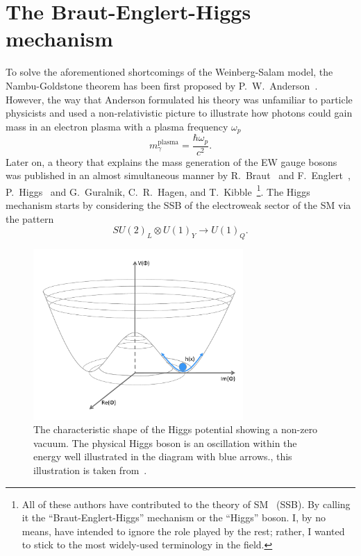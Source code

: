 \section{The Braut-Englert-Higgs mechanism \label{Higgsmech}}
To solve the aforementioned shortcomings of the Weinberg-Salam model, the Nambu-Goldstone theorem has been first proposed by P.~W.~Anderson~\cite{PhysRev.130.439}. However, the way that Anderson formulated his theory was unfamiliar to particle physicists and used a non-relativistic picture to illustrate how photons could gain mass in an electron plasma with a plasma frequency $\omega_{p}$ 
\begin{equation}
	m_\gamma^{\mathrm{plasma}} =\frac{\hbar \omega_p}{c^2}.
\end{equation}
Later on, a theory that explains the mass generation of the EW gauge bosons was published in an almost simultaneous manner by R.~Braut~ and F.~Englert~\cite{PhysRevLett.13.321}, P.~Higgs~\cite{PhysRevLett.13.508,HIGGS1964132} and G.~Guralnik, C.~R.~Hagen, and T.~Kibble~\cite{PhysRevLett.13.585,Guralnik:2009jd}\footnote{All of these authors have contributed to the theory of SM ~(SSB). By calling it the ``Braut-Englert-Higgs'' mechanism or the ``Higgs'' boson. I, by no means, have intended to ignore the role played by the rest; rather, I wanted to stick to the most widely-used terminology in the field.}.
The Higgs mechanism starts by considering the SSB of the electroweak sector of the SM via the pattern
\begin{equation}
	SU(2)_L \otimes U(1)_Y \longrightarrow U(1)_{Q} .
\end{equation}
\begin{figure}[t!]
	\begin{center}
		\includegraphics[width=8cm]{figures/HiggsPotential}
		\caption{The characteristic shape of the Higgs potential showing a non-zero vacuum. The physical Higgs boson is an oscillation within the energy well illustrated in the diagram with blue arrows., this illustration is taken from~\cite{Erler:2019hds}. \label{fig:higgs_hat} }
	\end{center}
\end{figure}

